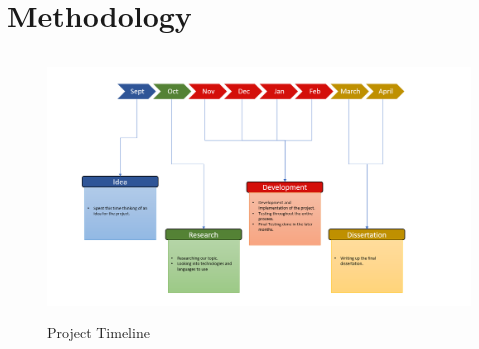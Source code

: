 
\chapter{Methodology}

\begin{figure}[H]
    \centering
    \includegraphics[width=140mm, height=70mm]{img/timeline.PNG}
    \caption{Project Timeline}
    \label{fig:timeline}
\end{figure}


